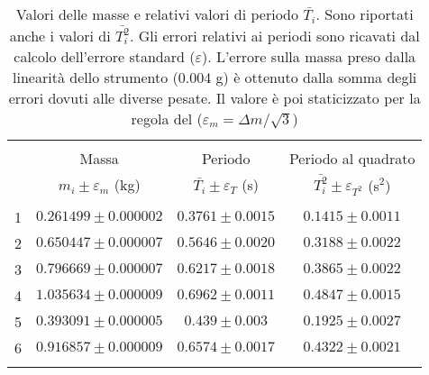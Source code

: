 \begin{table}[t]
    \centering
    \footnotesize
    \caption{Valori delle masse e relativi valori di periodo $\bar{T_i}$. Sono riportati anche i valori di
    $\bar{T_i^2}$. Gli errori relativi ai periodi sono ricavati dal calcolo dell'errore standard ($\varepsilon$). 
    L'errore sulla massa preso dalla linearità dello strumento (0.004 g) è ottenuto dalla somma degli errori dovuti 
    alle diverse pesate. Il valore è poi staticizzato per la regola del \treSigma ($\varepsilon_m = \Delta m/\sqrt{3}$)}
    \label{table:dyn_values}
    \begin{tabular}{lccc}
        \hline\hline\\[-1.5ex]
          & Massa                      & Periodo                         & Periodo al quadrato                       \\[+0.5ex]
          & $m_i\pm\varepsilon_m$ (kg) & $\bar{T_i}\pm\varepsilon_T$ (s) & $\bar{T_i^2}\pm\varepsilon_{T^2}$ (s$^2$) \\[+0.5ex] \hline \\[-1.5ex]
        1 & $0.261499\pm0.000002$      & $0.3761\pm0.0015$               & $0.1415\pm0.0011$                         \\[+0.5ex]
        2 & $0.650447\pm0.000007$      & $0.5646\pm0.0020$               & $0.3188\pm0.0022$                         \\[+0.5ex]
        3 & $0.796669\pm0.000007$      & $0.6217\pm0.0018$               & $0.3865\pm0.0022$                         \\[+0.5ex]
        4 & $1.035634\pm0.000009$      & $0.6962\pm0.0011$               & $0.4847\pm0.0015$                         \\[+0.5ex]
        5 & $0.393091\pm0.000005$      & $0.439 \pm0.003 $               & $0.1925\pm0.0027$                         \\[+0.5ex]
        6 & $0.916857\pm0.000009$      & $0.6574\pm0.0017$               & $0.4322\pm0.0021$                         \\[+0.5ex]
        \hline \\[-1.5ex]
        
    \end{tabular}
\end{table}

